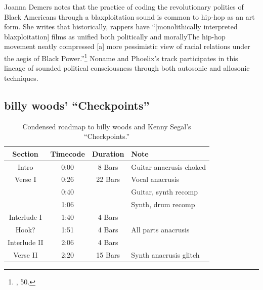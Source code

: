Joanna Demers notes that the practice of coding the revolutionary politics of Black Americans through a blaxploitation sound is common to hip-hop as an art form. She writes that historically, rappers have ``[monolithically interpreted blaxploitation] films as unified both politically and morally\textellipsis The hip-hop movement neatly compressed [a] more pessimistic view of racial relations under the aegis of Black Power.''\footnote{\cite{joannademersSampling1970sHipHop2003}, 50.} Noname and Phoelix's track participates in this lineage of sounded political consciousness through both autosonic and allosonic techniques.

\subsection*{\centering billy woods' ``Checkpoints''}

\begin{table}[ht]
    \centering
    \begin{tabular}{|c|c|c|l|}
        \hline
         Section      & Timecode & Duration & Note                          \\ \hline
         Intro        & 0:00     & 8 Bars   & Guitar anacrusis choked       \\ \hline
         Verse I      & 0:26     & 22 Bars  & Vocal anacrusis               \\ \hline
                      & 0:40     &          & Guitar, synth recomp          \\ \hline
                      & 1:06     &          & Synth, drum recomp            \\ \hline
         Interlude I  & 1:40     & 4 Bars   &                               \\ \hline
         Hook?        & 1:51     & 4 Bars   & All parts anacrusis           \\ \hline
         Interlude II & 2:06     & 4 Bars   &                               \\ \hline
         Verse II     & 2:20     & 15 Bars  & Synth anacrusis glitch        \\ \hline
         
    \end{tabular}
    \caption{Condensed roadmap to billy woods and Kenny Segal's ``Checkpoints.''}
    \label{tab:checkpoints}
\end{table}


